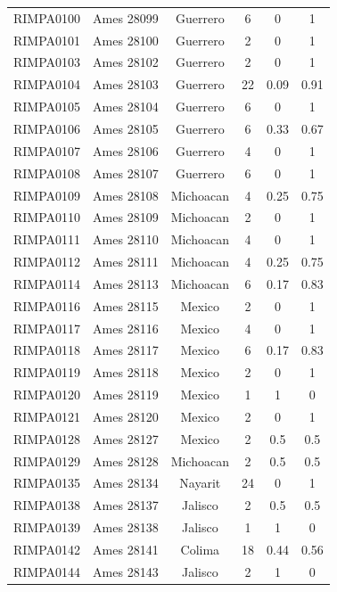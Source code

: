 \documentclass[11pt]{article}
\newcounter{rowno}
\begin{document}
\begin{scriptsize}
\begin{longtable}{>{\stepcounter{rowno}}cccccc}
    RIMPA0100 & Ames	28099 & Guerrero & 6     & 0     & 1 \\
    RIMPA0101 & Ames	28100 & Guerrero & 2     & 0     & 1 \\
    RIMPA0103 & Ames	28102 & Guerrero & 2     & 0     & 1 \\
    RIMPA0104 & Ames	28103 & Guerrero & 22    & 0.09 & 0.91 \\
    RIMPA0105 & Ames	28104 & Guerrero & 6     & 0     & 1 \\
    RIMPA0106 & Ames	28105 & Guerrero & 6     & 0.33 & 0.67 \\
    RIMPA0107 & Ames	28106 & Guerrero & 4     & 0     & 1 \\
    RIMPA0108 & Ames	28107 & Guerrero & 6     & 0     & 1 \\
    RIMPA0109 & Ames	28108 & Michoacan & 4     & 0.25  & 0.75 \\
    RIMPA0110 & Ames	28109 & Michoacan & 2     & 0     & 1 \\
    RIMPA0111 & Ames	28110 & Michoacan & 4     & 0     & 1 \\
    RIMPA0112 & Ames	28111 & Michoacan & 4     & 0.25  & 0.75 \\
    RIMPA0114 & Ames	28113 & Michoacan & 6     & 0.17 & 0.83 \\
    RIMPA0116 & Ames	28115 & Mexico & 2     & 0     & 1 \\
    RIMPA0117 & Ames	28116 & Mexico & 4     & 0     & 1 \\
    RIMPA0118 & Ames	28117 & Mexico & 6     & 0.17 & 0.83 \\
    RIMPA0119 & Ames	28118 & Mexico & 2     & 0     & 1 \\
    RIMPA0120 & Ames	28119 & Mexico & 1     & 1     & 0 \\
    RIMPA0121 & Ames	28120 & Mexico & 2     & 0     & 1 \\
    RIMPA0128 & Ames	28127 & Mexico & 2     & 0.5   & 0.5 \\
    RIMPA0129 & Ames	28128 & Michoacan & 2     & 0.5   & 0.5 \\
    RIMPA0135 & Ames	28134 & Nayarit & 24    & 0     & 1 \\
    RIMPA0138 & Ames	28137 & Jalisco & 2     & 0.5   & 0.5 \\
    RIMPA0139 & Ames	28138 & Jalisco & 1     & 1     & 0 \\
    RIMPA0142 & Ames	28141 & Colima & 18    & 0.44 & 0.56 \\
    RIMPA0144 & Ames	28143 & Jalisco & 2     & 1     & 0 \\

\end{longtable}
\end{scriptsize}
\end{document}
